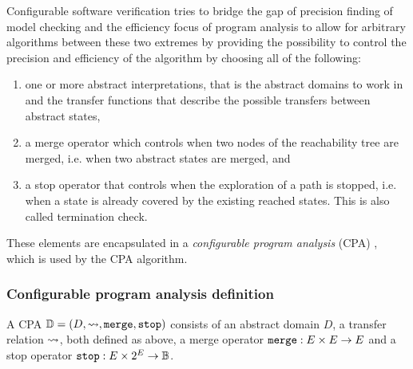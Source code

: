 Configurable software verification tries to bridge the gap of precision finding of model checking and the efficiency focus of program analysis to allow for arbitrary algorithms between these two extremes by providing the possibility to control the precision and efficiency of the algorithm by choosing all of the following:
\begin{enumerate}[label=\alph*)]
\item one or more abstract interpretations, that is the abstract domains to work in and the transfer functions that describe the possible transfers between abstract states,
\item a merge operator which controls when two nodes of the reachability tree are merged, i.e. when two abstract states are merged, and
\item a stop operator that controls when the exploration of a path is stopped, i.e. when a state is already covered by the existing reached states. This is also called termination check.
\end{enumerate}
These elements are encapsulated in a \emph{configurable program analysis} (CPA) \cite{Beyer2007} , which is used by the CPA algorithm.

\subsubsection{Configurable program analysis definition}
A CPA $\mathbb{D} = (D, \rightsquigarrow, \texttt{merge}, \texttt{stop})$ consists of an abstract domain $D$, a transfer relation $\rightsquigarrow$, both defined as above, a merge operator $\texttt{merge} : E \times E \rightarrow E$ and a stop operator $\texttt{stop} : E \times 2^E \rightarrow \mathbb{B}$.

